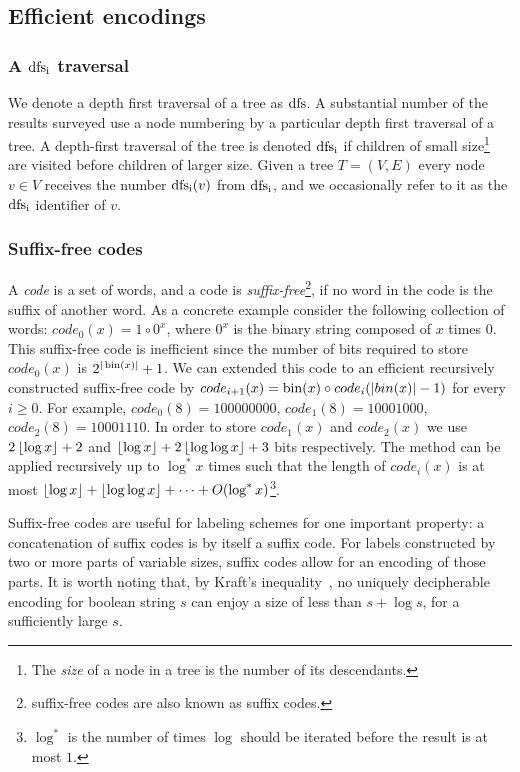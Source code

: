 \subsection{Efficient encodings}\label{sec:efficient-encoding}
\subsubsection{ A $\operatorname{dfs_i}$ traversal}\label{tec:dfs}
We denote a depth first traversal of a tree as $\operatorname{dfs}$.
A substantial number of the results surveyed use  a node numbering  by a  particular depth first traversal of a tree.
A depth-first traversal of the tree is denoted $\operatorname{dfs_i}$ if  children of small size\footnote{The \emph{size} of a node in a tree is the number of its descendants.} are visited before children of larger size.
Given a tree $T=(V,E)$  every node $v \in V$ receives the number $\operatorname{dfs_i}(v)$ from $\operatorname{dfs_i}$, and we occasionally refer to it as the $\operatorname{dfs_i}$ identifier of $v$.


\subsubsection{Suffix-free codes}\label{tec:suffix}
A \emph{code} is a set of words, and a code is \emph{suffix-free}\footnote{ suffix-free codes are also known as suffix codes.}, if no word in the code is the suffix of another word.
As a concrete example consider the following collection of words:
$code_0(x) = 1 \circ 0^x$, where $0^x$ is the binary string composed of $x$ times $0$.
This suffix-free code is inefficient since the number of bits required to store $code_0(x)$ is $2^{\vert \operatorname{bin}(x) \vert}+1$.
We can  extended this code  to an efficient  recursively constructed suffix-free code by
$code_{i+1}(x) = \operatorname{bin}(x) \circ code_i(\vert bin (x) \vert - 1)$ for every $i \geq 0$. 
For example,  $code_0(8) = 100000000$, $code_1(8) = 1000 1000$, $code_2(8) = 1000 11 10$.  
In order to store  $code_1(x)$ and $code_2(x)$ we use $2 \left\lfloor{\log{x}}\right\rfloor +2$ and $\left\lfloor{\log x}\right\rfloor+ 2\left\lfloor{\log \log x}\right\rfloor+ 3$ bits respectively.
The method can be applied recursively  up to $\log^* x $ times such that the length of 
 $code_i(x)$  is at most $   \left\lfloor{\log x}\right\rfloor  + \left\lfloor{ \log  \log x}\right\rfloor + \dots +  O(\log^* x)$\footnote{$\log^*$ is the number of times $\log$ should be iterated before the result is at most $1$.}.
 
Suffix-free codes are useful for labeling schemes for one important property: a concatenation of suffix codes is by itself a suffix code. For labels constructed by two or more parts of variable sizes, suffix codes allow for an encoding of those parts.
It is worth noting that, by Kraft's inequality~\cite{cover2012elements}, no  uniquely decipherable encoding  for boolean string $s$ can enjoy a size of less than $s + \log  s$, for a  sufficiently large $s$.

